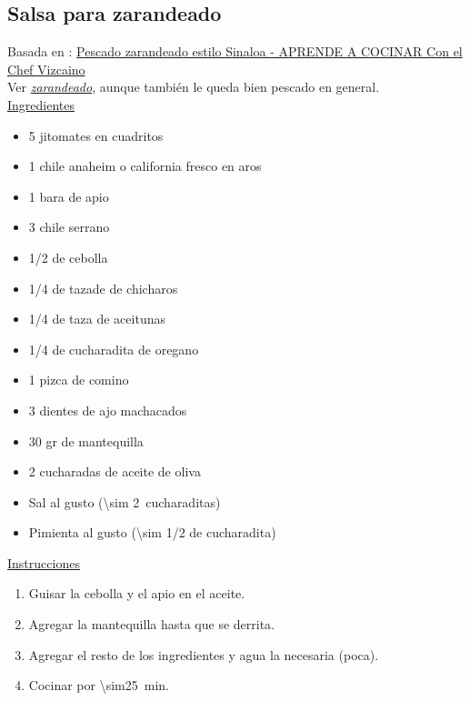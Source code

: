 \subsection{Salsa para zarandeado}
\label{salsa-zarandeado}

Basada en : \href{https://aprendeacocinarfacil.wordpress.com/2012/03/13/pescado-sarandeado-estilo-sinaloa-aya-pinchi/}{Pescado zarandeado estilo Sinaloa - APRENDE A COCINAR Con el Chef Vizcaino} \\

Ver \hyperref[receta:zarandeado]{\textit{zarandeado}}, aunque también le queda bien pescado en general.\\

\underline{Ingredientes}
\begin{itemize}
\item 5 jitomates en cuadritos
\item 1 chile anaheim o california fresco en aros
\item 1 bara de apio
\item 3 chile serrano
\item 1/2 de cebolla
\item 1/4 de tazade de chicharos
\item 1/4 de taza de aceitunas
\item 1/4 de cucharadita de oregano
\item 1 pizca de comino
\item 3 dientes de ajo machacados
\item 30 gr de mantequilla
\item 2 cucharadas de aceite de oliva
\item Sal al gusto (\SI{\sim 2}{cucharaditas})
\item Pimienta al gusto (\num{\sim 1/2} de cucharadita)
\end{itemize}


\underline{Instrucciones}
\begin{enumerate}
\item Guisar la cebolla y el apio en el aceite.
\item Agregar la mantequilla hasta que se derrita.
\item Agregar el resto de los ingredientes y agua la necesaria (poca).
\item Cocinar por \SI{\sim25}{min}.
\end{enumerate}

